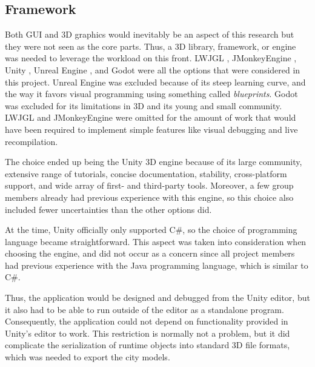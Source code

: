 \subsection{Framework}

Both GUI and 3D graphics would inevitably be an aspect of this research but they were not seen as the core parts.
Thus, a 3D library, framework, or engine was needed to leverage the workload on this front.
LWJGL \cite{lwjgl}, JMonkeyEngine \cite{jmonkey}, Unity \cite{unity}, Unreal Engine \cite{unreal}, and Godot \cite{godot} were all the options that were considered in this project.
Unreal Engine was excluded because of its steep learning curve, and the way it favors visual programming using something called \textit{blueprints}.
Godot was excluded for its limitations in 3D and its young and small community.
LWJGL and JMonkeyEngine were omitted for the amount of work that would have been required to implement simple features like visual debugging and live recompilation.

The choice ended up being the Unity 3D engine because of its large community, extensive range of tutorials, concise documentation, stability, cross-platform support, and wide array of first- and third-party tools.
Moreover, a few group members already had previous experience with this engine, so this choice also included fewer uncertainties than the other options did.

At the time, Unity officially only supported C\#, so the choice of programming language became straightforward.
This aspect was taken into consideration when choosing the engine, and did not occur as a concern since all project members had previous experience with the Java programming language, which is similar to C\#.

Thus, the application would be designed and debugged from the Unity editor, but it also had to be able to run outside of the editor as a standalone program.
Consequently, the application could not depend on functionality provided in Unity's editor to work.
This restriction is normally not a problem, but it did complicate the serialization of runtime objects into standard 3D file formats, which was needed to export the city models.